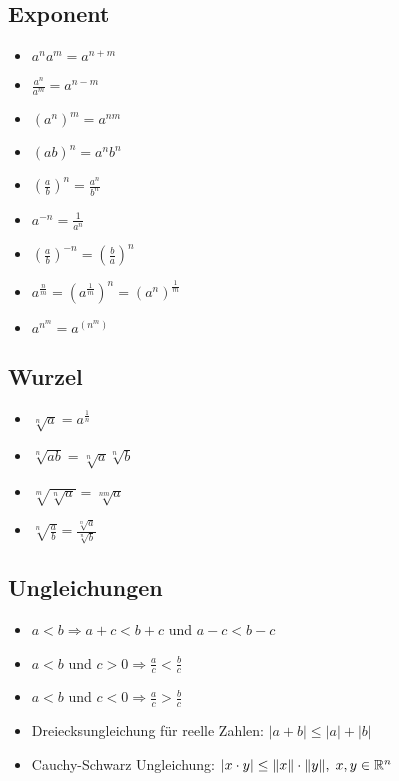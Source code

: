 \begin{multicols}{2}
\subsection{Exponent}
\begin{itemize}[leftmargin=*]
  \item $a^n a^m = a^{n + m}$
  \item $\frac{a^n}{a^m} = a^{n - m}$
  \item $(a^n)^m = a^{nm}$
  \item $(ab)^n = a^n b^n$
  \item $\left( \frac{a}{b} \right)^n = \frac{a^n}{b^n}$
  \item $a^{-n} = \frac{1}{a^n}$
  \item $\left( \frac{a}{b} \right)^{-n} = \left( \frac{b}{a} \right)^n$
  \item $a^\frac{n}{m} = (a^\frac{1}{m})^n = (a^n)^\frac{1}{m}$
  \item $a^{n^m} = a^{(n^m)}$
\end{itemize}
\columnbreak

\subsection{Wurzel}
\begin{itemize}[leftmargin=*]
  \item $\sqrt[n]{a} = a^\frac{1}{n}$
  \item $\sqrt[n]{ab} = \sqrt[n]{a} \sqrt[n]{b}$
  \item $\sqrt[m]{\sqrt[n]{a}} = \sqrt[nm]{a}$
  \item $\sqrt[n]{\frac{a}{b}} = \frac{\sqrt[n]{a}}{\sqrt[n]{b}}$
\end{itemize}

\end{multicols}

\subsection{Ungleichungen}
\begin{itemize}[leftmargin=*]
  \item $a < b \Rightarrow a + c < b + c$ und $a - c < b - c$
  \item $a < b$ und $c > 0 \Rightarrow \frac{a}{c} < \frac{b}{c}$
  \item $a < b$ und $c < 0 \Rightarrow \frac{a}{c} > \frac{b}{c}$ 
  \item Dreiecksungleichung für reelle Zahlen: $|a+b| \le |a|{+}|b|$ %
  \item Cauchy-Schwarz Ungleichung: $|x \cdot y| \leq \|x\| \cdot \|y\|, \; x,y \in \mathbb{R}^n$
\end{itemize}

